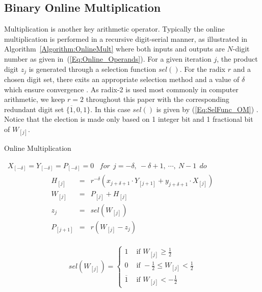 \documentclass[conference]{IEEEtran}
\begin{document}
\subsection{Binary Online Multiplication}
Multiplication is another key arithmetic operator. Typically the online multiplication is performed in a recursive digit-serial manner, as illustrated in Algorithm~\ref{Algorithm:OnlineMult} \cite{Ercegovac_OnlineMult} where both inputs and outputs are $N$-digit number as given in~(\ref{Eq:Online_Operands}). For a given iteration $j$, the product digit $z_j$ is generated through a selection function $sel()$. For the radix $r$ and a chosen digit set, there exits an appropriate selection method and a value of $\delta$ which ensure convergence \cite{Ercegovac_OnlineMult}. As radix-2 is used most commonly in computer arithmetic, we keep $r=2$ throughout this paper with the corresponding redundant digit set $\{\overline{1},0,1\}$. In this case $sel()$ is given by (\ref{Eq:SelFunc_OM}) \cite{Oregon_OnlineNetwork}. Notice that the election is made only based on 1 integer bit and 1 fractional bit of $W_{[j]}$.

\begin{algorithm}[tbp]
  \caption{Online Multiplication}
  \begin{algorithmic}[1]
    \REQUIRE~$X_{[-\delta]}=Y_{[-\delta]}=P_{[-\delta]}=0$
    \ENSURE~$for~~ j=-\delta,~-\delta+1,~\cdots,~N-1 ~~do$
      \begin{eqnarray}\label{Eq:OnlineMult_General}
        \begin{matrix}
          H_{[j]}   & = & r^{-\delta}\left(x_{j+\delta+1}\cdot Y_{[j+1]}+y_{j+\delta+1}\cdot X_{[j]}\right)\\
          W_{[j]}   & = & P_{[j]} + H_{[j]}\\
          z_j       & = & sel(W_{[j]})\\
          P_{[j+1]} & = & r\left(W_{[j]}-z_j\right)
        \end{matrix}
      \end{eqnarray}
  \label{Algorithm:OnlineMult}
  \end{algorithmic}
\end{algorithm}

\begin{eqnarray}\label{Eq:SelFunc_OM}
  sel(W_{[j]})=\begin{cases}
    1 & \text{ if } W_{[j]} \geqslant \frac{1}{2} \\
    0 & \text{ if } -\frac{1}{2}\leqslant W_{[j]}<\frac{1}{2} \\
    \overline{1} & \text{ if } W_{[j]}<-\frac{1}{2}
  \end{cases}
\end{eqnarray}
\end{document}
